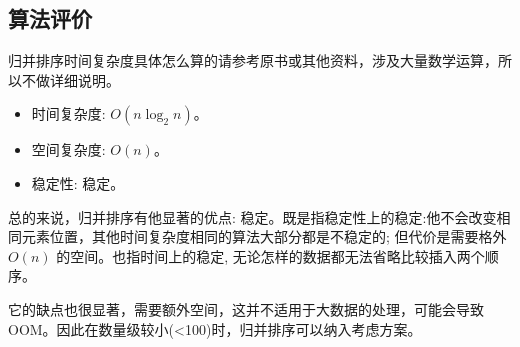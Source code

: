 \subsection{算法评价}

归并排序时间复杂度具体怎么算的请参考原书或其他资料，涉及大量数学运算，所以不做详细说明。

\begin{itemize}
  \item 时间复杂度: $O(n\log_2 n)$。
  \item 空间复杂度: $O(n)$。
  \item 稳定性: 稳定。
\end{itemize}

总的来说，归并排序有他显著的优点: 稳定。既是指稳定性上的稳定:他不会改变相同元素位置，其他时间复杂度相同的算法大部分都是不稳定的; 但代价是需要格外 $O(n)$ 的空间。也指时间上的稳定, 无论怎样的数据都无法省略比较插入两个顺序。

它的缺点也很显著，需要额外空间，这并不适用于大数据的处理，可能会导致 OOM。因此在数量级较小(<100)时，归并排序可以纳入考虑方案。

\newpage